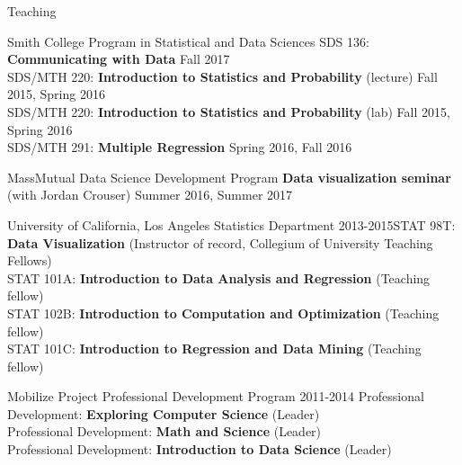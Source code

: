 \documentclass{resume} %
\begin{document}
\begin{rSection}{Teaching}

\begin{reSubsection}{Smith College }{ Program in Statistical and Data Sciences }{}{
SDS 136: \textbf{Communicating with Data} \hfill Fall 2017 \\
SDS/MTH 220: \textbf{Introduction to Statistics and Probability} (lecture) \hfill Fall 2015, Spring 2016 \\
SDS/MTH 220: \textbf{Introduction to Statistics and Probability} (lab) \hfill Fall 2015, Spring 2016 \\
SDS/MTH 291: \textbf{Multiple Regression} \hfill Spring 2016, Fall 2016\\}
\end{reSubsection}

\begin{reSubsection}{MassMutual }{ Data Science Development Program }{}{
\textbf{Data visualization seminar} (with Jordan Crouser) \hfill Summer 2016, Summer 2017\\}
\end{reSubsection}

\begin{reSubsection}{University of California, Los Angeles }{ Statistics Department }{2013-2015}{STAT 98T: \textbf{Data Visualization }(Instructor of record, Collegium of University Teaching Fellows) \\
STAT 101A: \textbf{Introduction to Data Analysis and Regression} (Teaching fellow) \\
STAT 102B: \textbf{Introduction to Computation and Optimization} (Teaching fellow) \\
STAT 101C: \textbf{Introduction to Regression and Data Mining} (Teaching fellow) \\
}
\end{reSubsection}

\begin{reSubsection}{Mobilize Project }{ Professional Development Program }{2011-2014}{
 Professional Development: \textbf{Exploring Computer Science} (Leader) \\
 Professional Development: \textbf{Math and Science} (Leader) \\
Professional Development: \textbf{Introduction to Data Science} (Leader) \\
}
\end{reSubsection}
\end{rSection}


\end{document}
